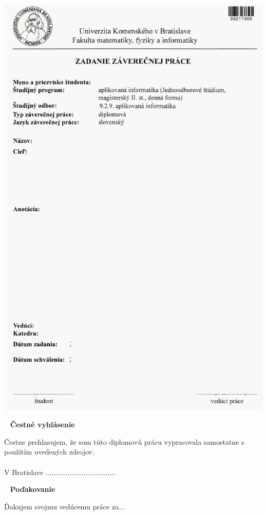 \newpage
\thispagestyle{empty}
\vspace*{-35px}\hspace*{-30px}
\includegraphics[scale=2.0]{pics/zadanie.jpg}

\newpage
{~}\vfill
{\noindent \large\bf Čestné vyhlásenie} 
\vspace{1.5cm}

Čestne prehlasujem, že som túto diplomovú prácu vypracovala samostatne s použitím uvedených zdrojov.\\\\ 
V Bratislave
\hfill ................................... 
\vspace{1cm}

\newpage
{~}\vfill
{\noindent\large\bf Poďakovanie} 
\vspace{1.5cm}

Ďakujem svojmu vedúcemu práce za...  \\
\vspace{1cm}

\newpage

